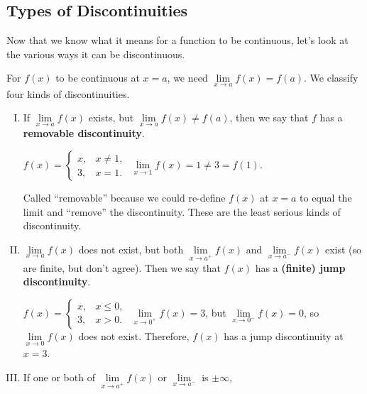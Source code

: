 
\subsection{Types of Discontinuities}
Now that we know what it means for a function to be continuous, let's
look at the various ways it can be discontinuous.

For $ f(x) $ to be continuous at $ x=a $, we need $ \lim\limits_{{x} \to {a}}f(x)=f(a) $.
We classify four kinds of discontinuities.
\begin{enumerate}[(I)]
    \item If $ \lim\limits_{{x} \to {a}}f(x) $ exists, but $ \lim\limits_{{x} \to {a}}f(x)\ne f(a) $,
          then we say that $ f $ has a \textbf{removable discontinuity}.
          \begin{Example}{}{}
              $ f(x)=\begin{cases}
                      x, & x\ne 1, \\
                      3, & x=1.
                  \end{cases} $ $ \lim\limits_{{x} \to {1}}f(x)=1\ne 3=f(1) $.
          \end{Example}
          \begin{Remark}{}{}
              Called ``removable'' because we could re-define $ f(x) $ at $ x=a $ to equal the limit and ``remove''
              the discontinuity. These are the least serious kinds of discontinuity.
          \end{Remark}
    \item $ \lim\limits_{{x} \to {a}}f(x) $ does not exist, but both $ \lim\limits_{{x} \to {a^+}}f(x) $
          and $ \lim\limits_{{x} \to {a^-}}f(x) $ exist (so are finite, but don't agree).
          Then we say that $ f(x) $ has a \textbf{(finite) jump discontinuity}.
          \begin{Example}{}{}
              $ f(x)=\begin{cases}
                      x, & x\le 0, \\
                      3, & x>0.
                  \end{cases} $ $ \lim\limits_{{x} \to {0^+}}f(x)=3 $, but $ \lim\limits_{{x} \to {0^-}}f(x)=0 $,
              so $ \lim\limits_{{x} \to {0}}f(x) $ does not exist. Therefore, $ f(x) $ has a jump discontinuity at $ x=3 $.
          \end{Example}
    \item If one or both of $ \lim\limits_{{x} \to {a^+}}f(x) $ or $ \lim\limits_{{x} \to {a^-}} $ is $ \pm\infty $,

\end{enumerate}
